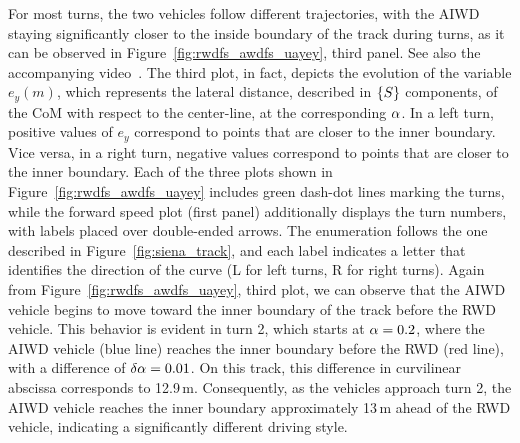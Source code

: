 For most turns, the two vehicles follow different trajectories, with the AIWD staying significantly closer to the inside boundary of the track during turns, as it can be observed in Figure~\ref{fig:rwdfs_awdfs_uayey}, third panel. See also the accompanying video~\cite{video:AWDFS:2024}.
The third plot, in fact, depicts the evolution of the variable $e_y (m)$, which represents the lateral distance, described in $\left\{S\right\}$ components, of the CoM with respect to the center-line, at the corresponding $\alpha$. In a left turn, positive values of $e_y$ correspond to points that are closer to the inner boundary. Vice versa, in a right turn, negative values correspond to points that are closer to the inner boundary. Each of the three plots shown in Figure~\ref{fig:rwdfs_awdfs_uayey} includes green dash-dot lines marking the turns, while the forward speed plot (first panel) additionally displays the turn numbers, with labels placed over double-ended arrows. The enumeration follows the one described in Figure~\ref{fig:siena_track}, and each label indicates a letter that identifies the direction of the curve (L for left turns, R for right turns). Again from Figure~\ref{fig:rwdfs_awdfs_uayey}, third plot, we can observe that the AIWD vehicle begins to move toward the inner boundary of the track before the RWD vehicle. This behavior is evident in turn 2, which starts at $\alpha=0.2$, where the AIWD vehicle (blue line) reaches the inner boundary before the RWD (red line), with a difference of $\delta\alpha=0.01$. On this track, this difference in curvilinear abscissa corresponds to 12.9\,m. Consequently, as the vehicles approach turn 2, the AIWD vehicle reaches the inner boundary approximately 13\,m ahead of the RWD vehicle, indicating a significantly different driving style.

